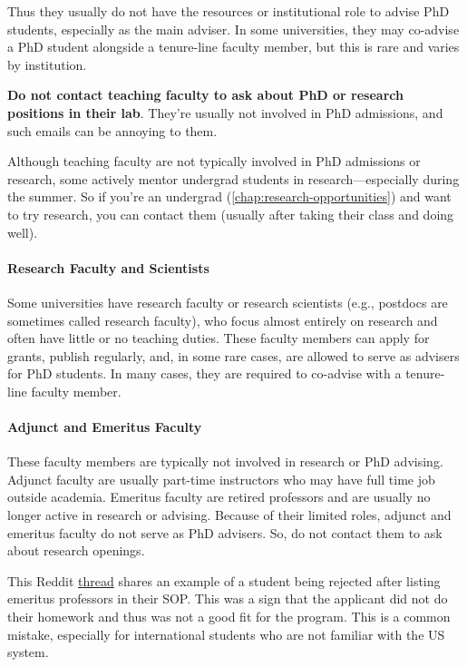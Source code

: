 \documentclass[oneside,11pt]{book}
\newenvironment{commentbox}[1][]{
  \small
  \begin{marker}[\faChessPawn{}]
    {\textbf{#1}}
  }{
  \end{marker}
}
\newenvironment{warningbox}[1][]{
  \small
  \begin{marker}[\faChessKing{}]
    {\textbf{#1}}
  }{
  \end{marker}
}
\begin{document}
Thus they usually do not have the resources or institutional role to advise PhD students, especially as the main adviser. In some universities, they may co-advise a PhD student alongside a tenure-line faculty member, but this is rare and varies by institution.

\textbf{Do not contact teaching faculty to ask about PhD or research positions in their lab}. They're usually not involved in PhD admissions, and such emails can be annoying to them.

\begin{commentbox}
    Although teaching faculty are not typically involved in PhD admissions or research, some actively mentor undergrad students in research---especially during the summer.  So if you're an undergrad (\autoref{chap:research-opportunities}) and want to try research, you can contact them (usually after taking their class and doing well).
 \end{commentbox}


\paragraph{Research Faculty and Scientists}

Some universities have research faculty or research scientists (e.g., postdocs are sometimes called research faculty), who focus almost entirely on research and often have little or no teaching duties. These faculty members can apply for grants, publish regularly, and, in some rare cases, are allowed to serve as advisers for PhD students. In many cases, they are required to co-advise with a tenure-line faculty member.

\paragraph{Adjunct and Emeritus Faculty} These faculty members are typically not involved in research or PhD advising. Adjunct faculty are usually part-time instructors who may have full time job outside academia. Emeritus faculty are retired professors and are usually no longer active in research or advising.
Because of their limited roles, adjunct and emeritus faculty do not serve as PhD advisers. So, do not contact them to ask about research openings.

\begin{warningbox}
This Reddit \href{https://www.reddit.com/r/gradadmissions/comments/1iyt2k8/_/}{thread} shares an example of a student being rejected after listing emeritus professors in their SOP. This was a sign that the applicant did not do their homework and thus was not a good fit for the program.  This is a common mistake, especially for international students who are not familiar with the US system.
\end{warningbox}
\end{document}
